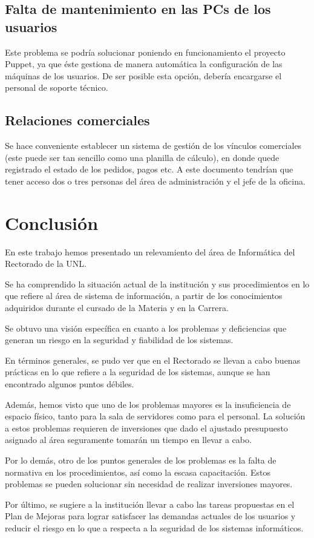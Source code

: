 \documentclass[a4paper,11pt,oneside]{article}
\begin{document}
\subsection{Falta de mantenimiento en las PCs de los usuarios}
Este problema se podría solucionar poniendo en funcionamiento el
proyecto Puppet, ya que éste gestiona de manera automática la
configuración de las máquinas de los usuarios.  De ser posible esta
opción, debería encargarse el personal de soporte técnico.
\subsection{Relaciones comerciales}
Se hace conveniente establecer un sistema de gestión de los vínculos
comerciales (este puede ser tan sencillo como una planilla de
cálculo), en donde quede registrado el estado de los pedidos, pagos
etc. A este documento tendrían que tener acceso dos o tres personas del
área de administración y el jefe de la oficina.

\newpage
\section{Conclusión}
En este trabajo hemos presentado un relevamiento del área de
Informática del Rectorado de la UNL.

Se ha comprendido la situación actual de la institución y sus
procedimientos en lo que refiere al área de sistema de información, a
partir de los conocimientos adquiridos durante el cursado de la
Materia y en la Carrera.

Se obtuvo una visión específica en cuanto a los problemas y
deficiencias que generan un riesgo en la seguridad y fiabilidad de los
sistemas.

En términos generales, se pudo ver que en el Rectorado se llevan a
cabo buenas prácticas en lo que refiere a la seguridad de los
sistemas, aunque se han encontrado algunos puntos débiles.

Además, hemos visto que uno de los problemas mayores es la
insuficiencia de espacio físico, tanto para la sala de servidores como
para el personal. La solución a estos problemas requieren de
inversiones que dado el ajustado presupuesto asignado al área
seguramente tomarán un tiempo en llevar a cabo.

Por lo demás, otro de los puntos generales de los problemas es la
falta de normativa en los procedimientos, así como la escasa
capacitación. Estos problemas se pueden solucionar sin necesidad de
realizar inversiones mayores.

Por último, se sugiere a la institución llevar a cabo las tareas
propuestas en el Plan de Mejoras para lograr satisfacer las demandas
actuales de los usuarios y reducir el riesgo en lo que a respecta a
la seguridad de los sistemas informáticos.
\end{document}
